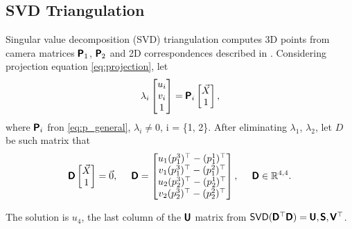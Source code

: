 \subsection{SVD Triangulation}
Singular value decomposition (SVD) triangulation computes 3D points from camera matrices $\pmb{\mathsf{P}}_1$, $\pmb{\mathsf{P}}_2$ and 2D correspondences described in \cite{hartley_zisserman_2004}.
Considering projection equation \autoref{eq:projection}, let 
\begin{equation}
    \lambda_i \begin{bmatrix} 
        u_i \\ v_i \\ 1 \end{bmatrix} = \pmb{\mathsf{P}}_i
    \begin{bmatrix} \vec{X} \\ 1
    \end{bmatrix},
\end{equation} 
where $\pmb{\mathsf{P}}_i$ fron \autoref{eq:p_general}, $\lambda_i \neq 0$, i = \{1, 2\}.
After eliminating $\lambda_1$, $\lambda_2$, let $D$ be such matrix that
\begin{equation}
    \pmb{\mathsf{D}} \begin{bmatrix} \vec{X} \\ 1 \end{bmatrix} = \vec{0}, \;\;\;\;\;
    \pmb{\mathsf{D}} = \begin{bmatrix}
        u_1 (p_1^3)^\top - (p_1^1)^\top \\
        v_1 (p_1^3)^\top - (p_1^2)^\top \\
        u_2 (p_2^3)^\top - (p_2^1)^\top \\
        v_2 (p_2^3)^\top - (p_2^2)^\top \\
    \end{bmatrix}, \;\;\;\;\; \pmb{\mathsf{D}} \in \mathbb{R}^{4, 4}.
\end{equation}

The solution is $u_4$, the last column of the $\pmb{\mathsf{U}}$ matrix from $\mathsf{SVD}(\pmb{\mathsf{D}}^\top \pmb{\mathsf{D}}) = \pmb{\mathsf{U}}, \pmb{\mathsf{S}}, \pmb{\mathsf{V}}^\top$.



